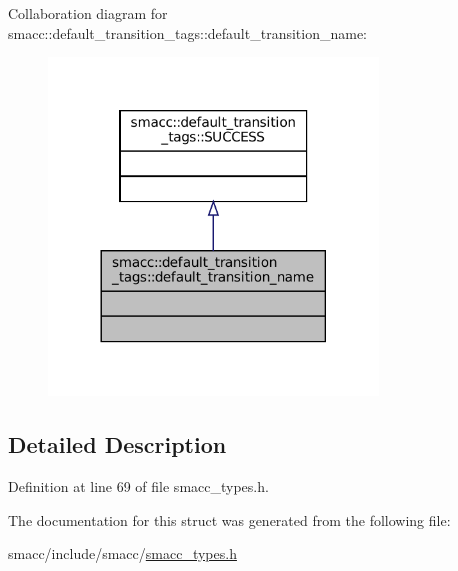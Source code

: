 Collaboration diagram for smacc\+:\+:default\+\_\+transition\+\_\+tags\+:\+:default\+\_\+transition\+\_\+name\+:
\nopagebreak
\begin{figure}[H]
\begin{center}
\leavevmode
\includegraphics[width=248pt]{structsmacc_1_1default__transition__tags_1_1default__transition__name__coll__graph}
\end{center}
\end{figure}


\subsection{Detailed Description}


Definition at line 69 of file smacc\+\_\+types.\+h.



The documentation for this struct was generated from the following file\+:\begin{DoxyCompactItemize}
\item 
smacc/include/smacc/\hyperlink{smacc__types_8h}{smacc\+\_\+types.\+h}\end{DoxyCompactItemize}
